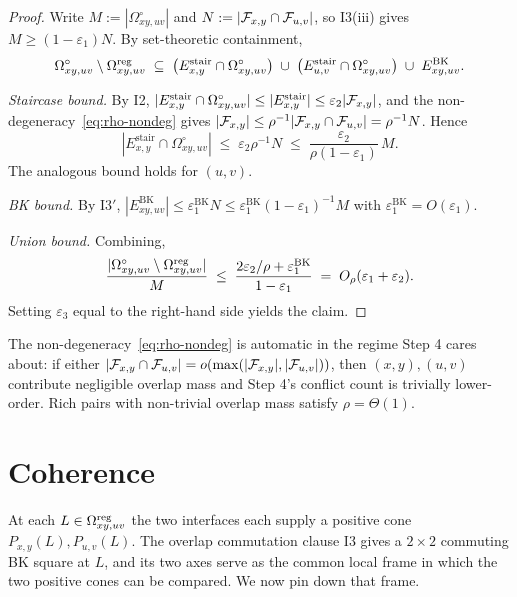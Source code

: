 \begin{proof}
Write $M:=|\Omega^{\circ}_{xy,uv}|$ and $N:=|\mathcal{F}_{x,y}\cap\mathcal{F}_{u,v}|$, so
\textsc{I3}(iii) gives $M\ge(1-\varepsilon_1)N$. By set-theoretic
containment,
\[
  \Omega^{\circ}_{xy,uv}\setminus\Omega^{\mathrm{reg}}_{xy,uv}
  \;\subseteq\;
  \bigl(E^{\mathrm{stair}}_{x,y}\cap\Omega^{\circ}_{xy,uv}\bigr)
  \;\cup\;
  \bigl(E^{\mathrm{stair}}_{u,v}\cap\Omega^{\circ}_{xy,uv}\bigr)
  \;\cup\;
  E^{\mathrm{BK}}_{xy,uv}.
\]

\emph{Staircase bound.}
By \textsc{I2},
$|E^{\mathrm{stair}}_{x,y}\cap\Omega^{\circ}_{xy,uv}|
   \le|E^{\mathrm{stair}}_{x,y}|\le\varepsilon_2|\mathcal{F}_{x,y}|$,
and the non-degeneracy~\eqref{eq:rho-nondeg} gives
$|\mathcal{F}_{x,y}|\le\rho^{-1}|\mathcal{F}_{x,y}\cap\mathcal{F}_{u,v}|=\rho^{-1}N$. Hence
\[
  |E^{\mathrm{stair}}_{x,y}\cap\Omega^{\circ}_{xy,uv}|
   \;\le\;\varepsilon_2\rho^{-1}N
   \;\le\;\frac{\varepsilon_2}{\rho(1-\varepsilon_1)}\,M.
\]
The analogous bound holds for $(u,v)$.

\emph{BK bound.}
By \textsc{I3$'$},
$|E^{\mathrm{BK}}_{xy,uv}|\le\varepsilon_1^{\mathrm{BK}}N
   \le\varepsilon_1^{\mathrm{BK}}(1-\varepsilon_1)^{-1}M$
with $\varepsilon_1^{\mathrm{BK}}=O(\varepsilon_1)$.

\emph{Union bound.}
Combining,
\[
  \frac{|\Omega^{\circ}_{xy,uv}\setminus\Omega^{\mathrm{reg}}_{xy,uv}|}{M}
   \;\le\;
   \frac{2\varepsilon_2/\rho+\varepsilon_1^{\mathrm{BK}}}{1-\varepsilon_1}
   \;=\;O_\rho(\varepsilon_1+\varepsilon_2).
\]
Setting $\varepsilon_3$ equal to the right-hand side yields the claim.
\end{proof}

\begin{remark}
The non-degeneracy~\eqref{eq:rho-nondeg} is automatic in the regime Step 4
cares about: if either $|\mathcal{F}_{x,y}\cap\mathcal{F}_{u,v}|=o(\max(|\mathcal{F}_{x,y}|,|\mathcal{F}_{u,v}|))$, then
$(x,y),(u,v)$ contribute negligible overlap mass and Step 4's conflict count
is trivially lower-order. Rich pairs with non-trivial overlap mass satisfy
$\rho=\Theta(1)$.
\end{remark}

\section{Coherence}\label{sec:coherence}

At each $L\in\Omega^{\mathrm{reg}}_{xy,uv}$ the two interfaces each supply a positive cone
$P_{x,y}(L),P_{u,v}(L)$. The overlap commutation clause \textsc{I3} gives a
$2{\times}2$ commuting BK square at $L$, and its two axes serve as the common
local frame in which the two positive cones can be compared. We now pin down
that frame.

